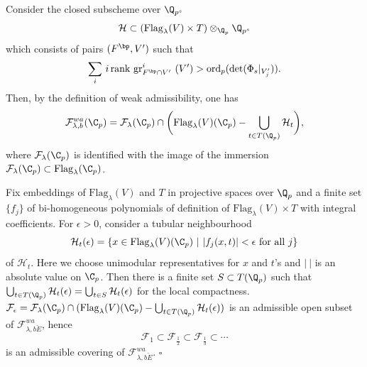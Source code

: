 Consider the closed subscheme over $\Q_{p^s}$
$$
     {\mathcal H} \subset
           (\mathrm{Flag}_\lambda(V) \times T)
                    \otimes_{\Q_p} \Q_{p^s}
$$
which consists of pairs $(F^{\bp}, V')$ such that
$$
     \displaystyle{\mathop{\sum}_i}\ i\,\mathrm{rank}\
               \mathrm{gr}_{F^{\bp} \cap V'}^i\ (V')
                > \mathrm{ord}_p(\det(\Phi_s|_{V'_j})).
$$
Then, by the definition of weak admissibility, one has
$$
    \mathcal{F}_{\lambda, b}^{wa}(\C_p)
       = \mathcal{F}_\lambda(\C_p) \cap
\biggl(\mathrm{Flag}_\lambda(V)(\C_p)
        - \bigcup_{t\in T(\Q_p)}{\mathcal H}_t\biggr),
$$
where ${\mathcal F}_\lambda(\C_p)$ is identified with the image of
the immersion
${\mathcal F}_\lambda(\C_p) \subset \mathrm{Flag}_{\lambda}(\C_p)$.

Fix embeddings of $\mathrm{Flag}_\lambda(V)$ and $T$
in projective spaces over $\Q_p$
and a finite set $\{ f_j \}$ of bi-homogeneous polynomials
of definition of $\mathrm{Flag}_\lambda(V) \times T$
with integral coefficients.
For $\epsilon > 0$, consider a tubular neighbourhood
$$
    {\mathcal H}_t(\epsilon)
        = \{ x \in \mathrm{Flag}_\lambda(V)(\C_p)
                      ~|~ |f_j(x, t)| < \epsilon~ \text{for all}~ j \}
$$
of ${\mathcal H}_t$.
Here we choose unimodular representatives for $x$ and $t${}'s
and $|\ |$ is an absolute value on $\C_p$.
Then there is a finite set $S \subset T(\Q_p)$ such that
$ \bigcup_{t \in T(\Q_p)}{\mathcal H}_t(\epsilon)
= \bigcup_{t \in S}{\mathcal H}_t(\epsilon)$
for the local compactness.
${\mathcal F}_\epsilon = {\mathcal F}_\lambda(\C_p)
\cap (\mathrm{Flag}_\lambda(V)(\C_p) -
\bigcup_{t \in T(\Q_p)}\mathcal{H}_t(\epsilon))$
is an admissible open subset of ${\mathcal F}_{\lambda, b \breve{E}}^{wa}$,
hence
$$
    {\mathcal F}_1 \subset {\mathcal F}_{\frac{1}{2}}
          \subset {\mathcal F}_{\frac{1}{3}} \subset \cdots
$$
is an admissible covering of ${\mathcal F}_{\lambda, b \breve{E}}^{wa}$.
\hspace{\fill} $\square$
